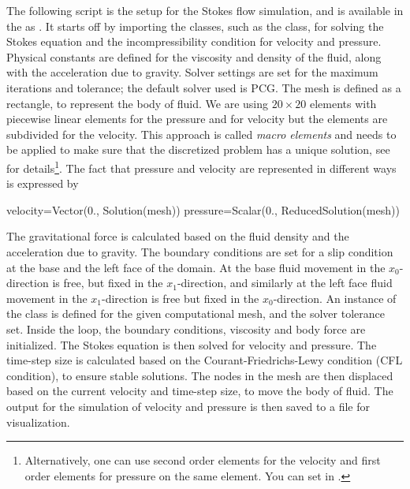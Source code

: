 The following \PYTHON script is the setup for the Stokes flow simulation, and
is available in the \ExampleDirectory as .
It starts off by importing the classes, such as the 
class, for solving the Stokes equation and the incompressibility condition for
velocity and pressure.
Physical constants are defined for the viscosity and density of the fluid,
along with the acceleration due to gravity.
Solver settings are set for the maximum iterations and tolerance; the default
solver used is PCG.
The mesh is defined as a rectangle, to represent the body of fluid.
We are using $20 \times 20$ elements with piecewise linear elements for the
pressure and for velocity but the elements are subdivided for the velocity.
This approach is called \textit{macro elements} and
needs to be applied to make sure that the discretized problem has a unique
solution, see~\cite{LBB} for details\footnote{Alternatively, one can use
second order elements for the velocity and first order elements for pressure
on the same element. You can set  in .}.
The fact that pressure and velocity are represented in different ways is
expressed by
\begin{python}
  velocity=Vector(0., Solution(mesh))
  pressure=Scalar(0., ReducedSolution(mesh))
\end{python}
The gravitational force is calculated based on the fluid density and the
acceleration due to gravity.
The boundary conditions are set for a slip condition at the base and the left
face of the domain. At the base fluid movement in the $x_{0}$-direction
is free, but fixed in the $x_{1}$-direction, and similarly at the left
face fluid movement in the $x_{1}$-direction is free  but fixed in
the $x_{0}$-direction.
An instance of the  class is defined for the
given computational mesh, and the solver tolerance set.
Inside the  loop, the boundary conditions, viscosity and body
force are initialized.
The Stokes equation is then solved for velocity and pressure.
The time-step size is calculated based on the Courant-Friedrichs-Lewy condition
(CFL condition), to ensure stable solutions.
The nodes in the mesh are then displaced based on the current velocity and
time-step size, to move the body of fluid.
The output for the simulation of velocity and pressure is then saved to a file
for visualization.
%
